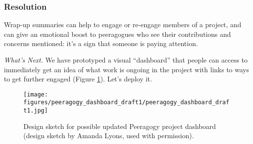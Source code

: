 \subsubsection*{Resolution} 
Wrap-up summaries can help to engage or re-engage members of a project, and can give an emotional boost to peeragogues who see their contributions and concerns mentioned: it's a sign that someone is paying attention.

\begin{framed}
\emph{What's Next.}
We have prototyped a visual ``dashboard'' that people can access to immediately get an idea of what work is ongoing in the project with links to ways to get further engaged (Figure \ref{dashboard}).  Let's deploy it.
\end{framed}    
\endgroup

\begin{figure}
\texttt{[image: figures/peeragogy\_dashboard\_draft1/peeragogy\_dashboard\_draft1.jpg]}
\caption{Design sketch for possible updated Peeragogy project dashboard (design sketch by Amanda Lyons, used with permission).\label{dashboard}}
\end{figure}

